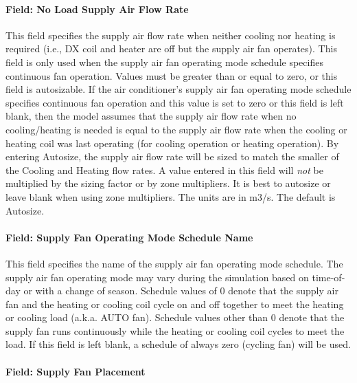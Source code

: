 \paragraph{Field: No Load Supply Air Flow Rate}\label{field-no-load-supply-air-flow-rate-3}

This field specifies the supply air flow rate when neither cooling nor heating is required (i.e., DX coil and heater are off but the supply air fan operates). This field is only used when the supply air fan operating mode schedule specifies continuous fan operation. Values must be greater than or equal to zero, or this field is autosizable. If the air conditioner's supply air fan operating mode schedule specifies continuous fan operation and this value is set to zero or this field is left blank, then the model assumes that the supply air flow rate when no cooling/heating is needed is equal to the supply air flow rate when the cooling or heating coil was last operating (for cooling operation or heating operation). By entering Autosize, the supply air flow rate will be sized to match the smaller of the Cooling and Heating flow rates. A value entered in this field will \emph{not} be multiplied by the sizing factor or by zone multipliers. It is best to autosize or leave blank when using zone multipliers. The units are in m3/s. The default is Autosize.

\paragraph{Field: Supply Fan Operating Mode Schedule Name}\label{field-supply-fan-operating-mode-schedule-name-5}

This field specifies the name of the supply air fan operating mode schedule. The supply air fan operating mode may vary during the simulation based on time-of-day or with a change of season. Schedule values of 0 denote that the supply air fan and the heating or cooling coil cycle on and off together to meet the heating or cooling load (a.k.a. AUTO fan). Schedule values other than 0 denote that the supply fan runs continuously while the heating or cooling coil cycles to meet the load. If this field is left blank, a schedule of always zero (cycling fan) will be used.

\paragraph{Field: Supply Fan Placement}\label{field-supply-fan-placement-5}

